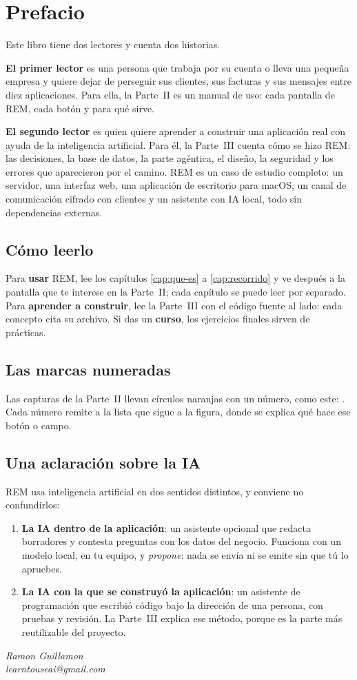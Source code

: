 \chapter*{Prefacio}

Este libro tiene dos lectores y cuenta dos historias.

\textbf{El primer lector} es una persona que trabaja por su cuenta o lleva una pequeña empresa y quiere dejar de perseguir sus clientes, sus facturas y sus mensajes entre diez aplicaciones. Para ella, la Parte~II es un manual de uso: cada pantalla de REM, cada botón y para qué sirve.

\textbf{El segundo lector} es quien quiere aprender a construir una aplicación real con ayuda de la inteligencia artificial. Para él, la Parte~III cuenta cómo se hizo REM: las decisiones, la base de datos, la parte agéntica, el diseño, la seguridad y los errores que aparecieron por el camino. REM es un caso de estudio completo: un servidor, una interfaz web, una aplicación de escritorio para macOS, un canal de comunicación cifrado con clientes y un asistente con IA local, todo sin dependencias externas.

\section*{Cómo leerlo}
Para \textbf{usar} REM, lee los capítulos \ref{cap:que-es} a \ref{cap:recorrido} y ve después a la pantalla que te interese en la Parte~II; cada capítulo se puede leer por separado. Para \textbf{aprender a construir}, lee la Parte~III con el código fuente al lado: cada concepto cita su archivo. Si das un \textbf{curso}, los ejercicios finales sirven de prácticas.

\section*{Las marcas numeradas}
Las capturas de la Parte~II llevan círculos naranjas con un número, como este: . Cada número remite a la lista que sigue a la figura, donde se explica qué hace ese botón o campo.

\section*{Una aclaración sobre la IA}
REM usa inteligencia artificial en dos sentidos distintos, y conviene no confundirlos:
\begin{enumerate}
\item \textbf{La IA dentro de la aplicación}: un asistente opcional que redacta borradores y contesta preguntas con los datos del negocio. Funciona con un modelo local, en tu equipo, y \emph{propone}: nada se envía ni se emite sin que tú lo apruebes.
\item \textbf{La IA con la que se construyó la aplicación}: un asistente de programación que escribió código bajo la dirección de una persona, con pruebas y revisión. La Parte~III explica ese método, porque es la parte más reutilizable del proyecto.
\end{enumerate}

\vspace{1em}\hfill\textit{Ramon Guillamon}\\
\hfill\textit{learntouseai@gmail.com}
